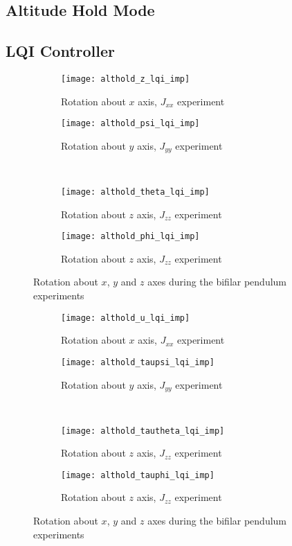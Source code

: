 \begin{appendices}
\section*{Altitude Hold Mode}

\subsection*{LQI Controller}

\begin{figure}[H]
\begin{subfigure}{.5\linewidth}
\centering
\texttt{[image: althold\_z\_lqi\_imp]}
\caption{Rotation about $x$ axis, $J_{xx}$ experiment}
\label{fig:althold_z_lqi_imp}
\end{subfigure}%
\begin{subfigure}{.5\linewidth}
\centering
\texttt{[image: althold\_psi\_lqi\_imp]}
\caption{Rotation about $y$ axis, $J_{yy}$ experiment}
\label{fig:althold_psi_lqi_imp}
\end{subfigure}\\[1ex]
\begin{subfigure}{0.5\linewidth}
\centering
\texttt{[image: althold\_theta\_lqi\_imp]}
\caption{Rotation about $z$ axis, $J_{zz}$ experiment}
\label{fig:althold_theta_lqi_imp}
\end{subfigure}
\begin{subfigure}{0.5\linewidth}
\centering
\texttt{[image: althold\_phi\_lqi\_imp]}
\caption{Rotation about $z$ axis, $J_{zz}$ experiment}
\label{fig:althold_phi_lqi_imp}
\end{subfigure}
\caption{Rotation about $x$, $y$ and $z$ axes during the bifilar pendulum experiments}
\label{fig:althold_lqi_imp}
\end{figure}

\begin{figure}[H]
\begin{subfigure}{.5\linewidth}
\centering
\texttt{[image: althold\_u\_lqi\_imp]}
\caption{Rotation about $x$ axis, $J_{xx}$ experiment}
\label{fig:althold_u_lqi_imp}
\end{subfigure}%
\begin{subfigure}{.5\linewidth}
\centering
\texttt{[image: althold\_taupsi\_lqi\_imp]}
\caption{Rotation about $y$ axis, $J_{yy}$ experiment}
\label{fig:althold_taupsi_lqi_imp}
\end{subfigure}\\[1ex]
\begin{subfigure}{0.5\linewidth}
\centering
\texttt{[image: althold\_tautheta\_lqi\_imp]}
\caption{Rotation about $z$ axis, $J_{zz}$ experiment}
\label{fig:althold_tautheta_lqi_imp}
\end{subfigure}
\begin{subfigure}{0.5\linewidth}
\centering
\texttt{[image: althold\_tauphi\_lqi\_imp]}
\caption{Rotation about $z$ axis, $J_{zz}$ experiment}
\label{fig:althold_tauphi_lqi_imp}
\end{subfigure}
\caption{Rotation about $x$, $y$ and $z$ axes during the bifilar pendulum experiments}
\label{fig:althold_control_lqi}
\end{figure}


\end{appendices}
